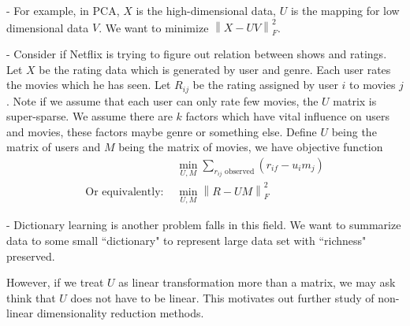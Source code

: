 - For example, in PCA, $X$ is the high-dimensional data, $U$ is the mapping for low dimensional data $V$. We want to minimize $\left\lVert X - UV\right\rVert^2_F$.

- Consider if Netflix is trying to figure out relation between shows and ratings. Let $X$ be the rating data which is generated by user and genre. Each user rates the movies which he has seen.
Let $R_{ij}$ be the rating assigned by user $i$ to movies $j$. Note if we assume that each user can only rate few movies, the $U$ matrix is super-sparse. We assume there are $k$ factors which have vital influence on users and movies, these factors maybe genre or something else. Define $U$ being the matrix of users and $M$ being the matrix of movies, we have objective function 
\begin{align*}
&\min_{U,M}\sum_{r_{ij} \text{ observed}}(r_{if} - u_im_j)\\
\text{Or equivalently: } & \min_{U,M} \left\lVert R - UM\right\rVert^2_F
\end{align*}

- Dictionary learning is another problem falls in this field. We want to summarize data to some small ``dictionary" to represent large data set with ``richness" preserved.

However, if we treat $U$ as linear transformation more than a matrix, we may ask think that $U$ does not have to be linear. This motivates out further study of non-linear dimensionality reduction methods.
